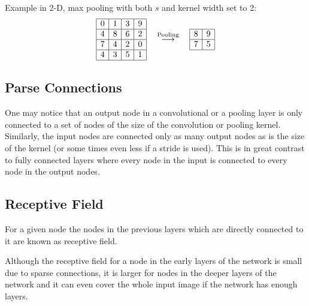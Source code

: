 \documentclass[]{article}
\begin{document}
Example in 2-D, max pooling with both $s$ and kernel width set to 2:
\[
\begin{array}{|c|c|c|c|}
  \hline
  0 & 1 & 3 & 9\\
  \hline
  4 & 8 & 6 & 2\\
  \hline
  7 & 4 & 2 & 0\\
  \hline
  4 & 3 & 5 & 1\\
  \hline
 \end{array}
 \quad \stackrel{\text{Pooling}}{\longrightarrow} \quad
 \begin{array}{|c|c|}
   \hline
   8 & 9\\
   \hline
   7 & 5\\
   \hline
  \end{array}
 \]

\subsection{Parse Connections}
One may notice that an output node in a convolutional or a pooling layer is only
connected to a set of nodes of the size of the convolution or pooling kernel.
Similarly, the input nodes are connected only as many output nodes as is the size
of the kernel (or some times even less if a stride is used). This is in great contrast
to fully connected layers where every node in the input is connected to every node
in the output nodes.


\subsection{Receptive Field}
For a given node the nodes in the previous layers which are directly connected
to it are known as receptive field.

Although the receptive field for a node in the early layers of the network is small
due to sparse connections, it is larger for nodes in the deeper layers of the network
and it can even cover the whole input image if the network has enough layers.
\end{document}
